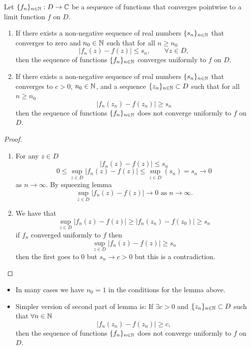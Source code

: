 \documentclass[10pt, a4paper]{article}
\begin{document}
\begin{lemma}
    Let $\{f_n\}_{n \in \mathbb{N}} : D \to \mathbb{C}$ be a sequence of functions that converges pointwise to a limit function $f$ on $D$.

    \begin{enumerate}[label = (\roman*)]
        \item If there exists a non-negative sequence of real numbers $\{s_n\}_{n \in \mathbb{N}}$ that converges to zero and $n_0 \in \mathbb{N}$ such that for all $n \geq n_0$
        \[
        |f_n(z) - f(z)| \leq s_n,\qquad \forall z \in D,
        \]
        then the sequence of functions $\{f_n\}_{n \in \mathbb{N}}$ converges uniformly to $f$ on $D$.

        \item If there exists a non-negative sequence of real numbers $\{s_n\}_{n \in \mathbb{N}}$ that converges to $c > 0$,
        $n_0 \in \mathbb{N}$,
        and a sequence $\{z_n\}_{n \in \mathbb{N}} \subset D$ such that for all $n \geq n_0$
        \[
        |f_n(z_n) - f(z_n)| \geq s_n
        \]
        then the sequence of functions $\{f_n\}_{n \in \mathbb{N}}$ does not converge uniformly to $f$ on $D$.
    \end{enumerate}

    \begin{proof}
        \begin{enumerate}[label = (\roman*)]
            \item For any $z \in D$
            \[
            |f_n(z) - f(z)| \leq s_n
            \]
            \[
            0 \leq \sup_{z \in D}|f_n(z) - f(z)| \leq \sup_{z \in D}(s_n) = s_n \to 0
            \]
            as $n \to \infty$.
            By squeezing lemma
            \[
            \sup_{z \in D}|f_n(z) - f(z)| \to 0\text{ as } n \to \infty.
            \]

            \item We have that
            \[
            \sup_{z \in D}|f_n(z) - f(z)| \geq |f_n(z_n) - f(z_0)| \geq s_n
            \]
            if $f_n$ converged uniformly to $f$ then
            \[
            \sup_{z \in D}|f_n(z) - f(z)| \geq s_n
            \]
            then the first goes to $0$ but $s_n \to c > 0$ but this is a contradiction.
        \end{enumerate}
    \end{proof}
\end{lemma}

\begin{remark}\phantom{}
    \begin{itemize}
        \item In many cases we have $n_0 = 1$ in the conditions for the lemma above.

        \item Simpler version of second part of lemma is:
        If $\exists c > 0$ and $\{z_n\}_{n \in \mathbb{N}} \subset D$ such that $\forall n \in \mathbb{N}$
        \[
        |f_n(z_n) - f(z_n)| \geq c,
        \]
        then the sequence of functions $\{f_n\}_{n \in \mathbb{N}}$ does not converge uniformly to $f$ on $D$.
    \end{itemize}
\end{remark}
\end{document}
